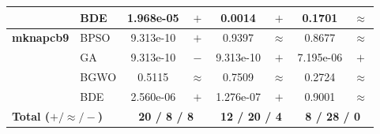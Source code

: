 \begin{table}[htbp]
\begin{tabular*}{\textwidth}{@{\extracolsep{\fill}}llcccccc@{}}
                       & BDE   & 1.968e-05 & $+$ &    0.0014 & $+$ &    0.1701 & $\approx$ \\
    \midrule
    \textbf{mknapcb9}  & BPSO  & 9.313e-10 & $+$ &    0.9397 & $\approx$ &    0.8677 & $\approx$ \\
                       & GA    & 9.313e-10 & $-$ & 9.313e-10 & $+$ & 7.195e-06 & $+$ \\
                       & BGWO  &    0.5115 & $\approx$ &    0.7509 & $\approx$ &    0.2724 & $\approx$ \\
                       & BDE   & 2.560e-06 & $+$ & 1.276e-07 & $+$ &    0.9001 & $\approx$ \\
    \midrule
    \multicolumn{2}{l}{\textbf{Total ($+ / \approx / -$)}} & \multicolumn{2}{c}{\textbf{20 / 8 / 8}}  & \multicolumn{2}{c}{\textbf{12 / 20 / 4}}  & \multicolumn{2}{c}{\textbf{8 / 28 / 0}} \\
    \bottomrule
  \end{tabular*}
  \vspace{1ex}
\end{table}
